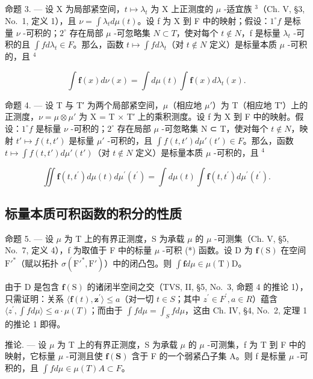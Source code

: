 命题 3. --- 设 X 为局部紧空间，\(t \mapsto \lambda_{t}\) 为 X 上正测度的 \(\mu\) -适宜族 \(^{3}\)（Ch. V, §3, No.~1, 定义 1），且 \(\nu = \int \lambda_{t} d\mu(t)\)。设 f 为 X 到 F 中的映射；假设：\(1^{\circ} f\) 是标量 \(\nu\) -可积的；\(2^{\circ}\) 存在局部 \(\mu\) -可忽略集 \(N \subset T\)，使对每个 \(t \notin N\)，f 是标量 \(\lambda_{t}\) -可积的且 \(\int f d\lambda_{t} \in F\)。那么，函数 \(t \mapsto \int f d\lambda_{t}\)（对 \(t \notin N\) 定义）是标量本质 \(\mu\) -可积的，且 \(^{4}\)

\[
\int \mathbf {f} (x) d \nu (x) = \int d \mu (t) \int \mathbf {f} (x) d \lambda_ {t} (x).
\]

命题 4. --- 设 T 与 T′ 为两个局部紧空间，\(\mu\)（相应地 \(\mu'\)）为 T（相应地 T′）上的正测度，\(\nu = \mu \otimes \mu'\) 为 X = T × T′ 上的乘积测度。设 f 为 X 到 F 中的映射。假设：\(1^{\circ} f\) 是标量 \(\nu\) -可积的；\(2^{\circ}\) 存在局部 \(\mu\) -可忽略集 N ⊂ T，使对每个 \(t \notin N\)，映射 \(t' \mapsto f(t, t')\) 是标量 \(\mu'\) -可积的，且 \(\int f(t, t') d\mu'(t') \in F\)。那么，函数 \(t \mapsto \int f(t, t') d\mu'(t')\)（对 \(t \notin N\) 定义）是标量本质 \(\mu\) -可积的，且 \(^{4}\)

\[
\iint \mathbf {f} (t, t ^ {\prime}) d \mu (t) d \mu^ {\prime} (t ^ {\prime}) = \int d \mu (t) \int \mathbf {f} (t, t ^ {\prime}) d \mu^ {\prime} (t ^ {\prime}).
\]

\subsection{标量本质可积函数的积分的性质}

命题 5. --- 设 \(\mu\) 为 T 上的有界正测度，S 为承载 \(\mu\) 的 \(\mu\) -可测集（Ch. V, §5, No.~7, 定义 4），f 为取值于 F 中的标量 \(\mu\) -可积 (*) 函数。设 D 为 \(\mathbf{f}(\mathrm{S})\) 在空间 \(\mathrm{F}'^*\)（赋以拓扑 \(\sigma(\mathrm{F}'^*, \mathrm{F}')\)）中的闭凸包。则 \(\int \mathbf{f} d\mu \in \mu(\mathrm{T})\mathrm{D}\)。

由于 D 是包含 \(\mathbf{f}(\mathrm{S})\) 的诸闭半空间之交（TVS, II, §5, No.~3, 命题 4 的推论 1），只需证明：关系 \(\langle\mathbf{f}(t),\mathbf{z}^{\prime}\rangle\leqslant a\)（对一切 \(t\in S\)；其中 \(z^{\prime}\in F^{\prime},a\in R\)）蕴含 \(\langle z^{\prime},\int f d\mu\rangle\leqslant a\cdot\mu(T)\)；而由于 \(\int f d\mu=\int_{S}f d\mu\)，这由 Ch. IV, §4, No.~2, 定理 1 的推论 1 即得。

推论. --- 设 \(\mu\) 为 T 上的有界正测度，S 为承载 \(\mu\) 的 \(\mu\) -可测集，f 为 T 到 F 中的映射，它标量 \(\mu\) -可测且使 \(\mathbf{f}(\mathbf{S})\) 含于 F 的一个弱紧凸子集 A。则 f 是标量 \(\mu\) -可积的，且 \(\int f d\mu \in \mu(T)A \subset F\)。

